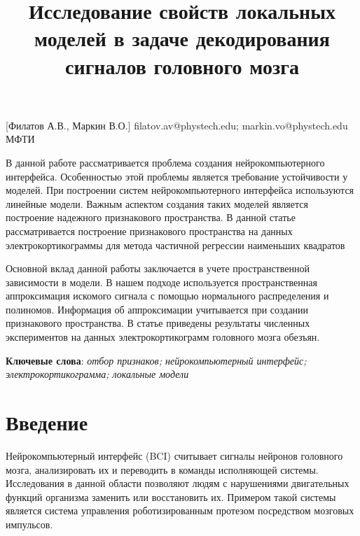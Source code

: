 \documentclass[12pt, twoside]{article}
\begin{document}
\title
    [Исследование свойств локальных моделей] %
    {Исследование свойств локальных моделей в задаче декодирования сигналов головного мозга}
\author
[] %
{} %
[Филатов А.В., Маркин В.О.] %
\email
{filatov.av@phystech.edu; markin.vo@phystech.edu}
\organization
{МФТИ}
\abstract
    {
		В данной работе рассматривается проблема создания нейрокомпьютерного интерфейса. Особенностью этой проблемы является требование устойчивости у моделей. При построении систем нейрокомпьютерного интерфейса используются линейные модели. Важным аспектом создания таких моделей является построение надежного
		 признакового пространства. В данной статье рассматривается построение признакового пространства на данных электрокортикограммы для метода частичной регрессии наименьших квадратов
		
		Основной вклад данной работы заключается в учете пространственной зависимости в модели. В нашем подходе используется пространственная аппроксимация искомого сигнала с помощью нормального распределения и полиномов. Информация об аппроксимации учитывается при создании признакового пространства. В статье приведены результаты численных экспериментов на данных электрокортикограмм головного мозга обезъян.
		
\bigskip
\noindent
\textbf{Ключевые слова}: \emph {отбор признаков; нейрокомпьютерный интерфейс; электрокортикограмма; локальные модели }
}

\maketitle
\section{Введение}
Нейрокомпьютерный интерфейс (BCI) \cite{shih2012brain} 
считывает сигналы нейронов головного мозга, анализировать их   и переводить в команды исполняющей системы. Исследования в данной области позволяют людям с нарушениями двигательных функций организма заменить или восстановить их. Примером такой системы является система управления роботизированным протезом посредством мозговых импульсов. 
\end{document}
